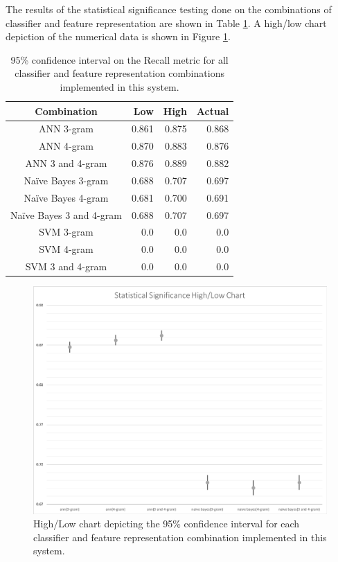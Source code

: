 \documentclass[conference]{sig-alternate-05-2015}
\begin{document}
The results of the statistical significance testing done on the combinations of
classifier and feature representation are shown in Table \ref{tab:stat_sig}. A
high/low chart depiction of the numerical data is shown in Figure
\ref{fig:stat_sig_highlow}.

\begin{table}
  \centering
  \begin{tabular}{| c | r | r | r |}
    \hline
    \textbf{Combination} & \textbf{Low} & \textbf{High} & \textbf{Actual} \\
    \hline\hline
    ANN 3-gram & 0.861 & 0.875 & 0.868 \\
    \hline
    ANN 4-gram & 0.870 & 0.883 & 0.876 \\
    \hline
    ANN 3 and 4-gram & 0.876 & 0.889 & 0.882 \\
    \hline
    Na\"ive Bayes 3-gram & 0.688 & 0.707 & 0.697 \\
    \hline
    Na\"ive Bayes 4-gram & 0.681 & 0.700 & 0.691 \\
    \hline
    Na\"ive Bayes 3 and 4-gram & 0.688 & 0.707 & 0.697 \\
    \hline
    SVM 3-gram & 0.0 & 0.0 & 0.0 \\
    \hline
    SVM 4-gram & 0.0 & 0.0 & 0.0 \\
    \hline
    SVM 3 and 4-gram & 0.0 & 0.0 & 0.0 \\
    \hline
  \end{tabular}
  \caption{95\% confidence interval on the Recall metric for all classifier and
  feature representation combinations implemented in this system.}
  \label{tab:stat_sig}
\end{table}

\begin{figure}[ht!]
  \centering
  \includegraphics[width=.5\textwidth]{statsig_highlow.png}
  \caption{High/Low chart depicting the 95\% confidence interval for each
  classifier and feature representation combination implemented in this system.}
  \label{fig:stat_sig_highlow}
\end{figure}
\end{document}
